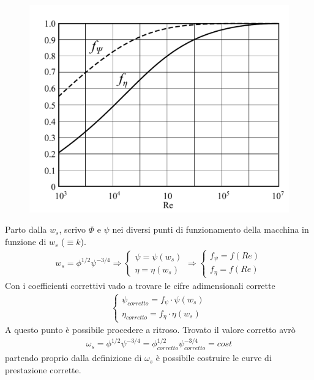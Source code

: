 \begin{figure}
\begin{minipage}{.6\textwidth}
  \centering
  \includegraphics[width=.95\linewidth]{fig/secondo_2.pdf}
  \label{fig:secondo_2}
\end{minipage}
\end{figure}

Parto dalla $w_s$, scrivo $\Phi$ e $\psi$ nei diversi punti di funzionamento della macchina in funzione di $w_s$ ($\equiv k$). 
\begin{align*}
w_s= \phi^{1/2}\psi^{-3/4} \Rightarrow 
\begin{cases}
\psi = \psi(w_s)\\
\eta = \eta(w_s)
\end{cases}
\Rightarrow
\begin{cases}
f_{\psi} = f(Re)\\
f_{\eta} = f(Re)
\end{cases}
\end{align*}
Con i coefficienti correttivi vado a trovare le cifre adimensionali corrette \begin{align*}
\begin{cases}
\psi_{corretto} = f_{\psi} \cdot \psi(w_s)\\
\eta_{corretto} = f_{\eta} \cdot \eta(w_s)
\end{cases}
\end{align*}
A questo punto è possibile procedere a ritroso. Trovato il valore corretto avrò
\begin{align*}
\omega_s = \phi^{1/2} \psi^{-3/4} =  \phi_{corretto}^{1/2} \psi_{corretto}^{-3/4} = cost
\end{align*}
partendo proprio dalla definizione di $\omega_s$ è possibile costruire le curve di prestazione corrette.

